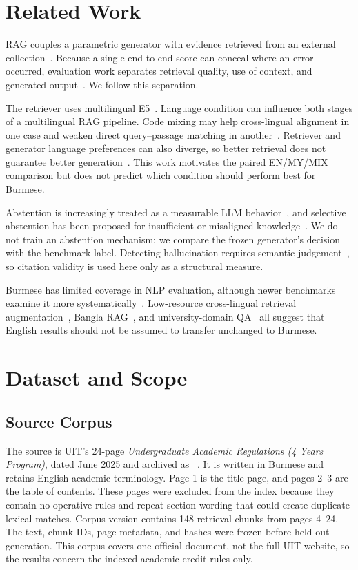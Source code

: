 \documentclass[a4paper,conference]{IEEEtran}
\newcommand{\code}[1]{\texttt{\detokenize{#1}}}
\begin{document}
\section{Related Work}
RAG couples a parametric generator with evidence retrieved from an external collection~\cite{lewis2020rag}. Because a single end-to-end score can conceal where an error occurred, evaluation work separates retrieval quality, use of context, and generated output~\cite{es2024ragas}. We follow this separation.

The retriever uses multilingual E5~\cite{wang2024e5}. Language condition can influence both stages of a multilingual RAG pipeline. Code mixing may help cross-lingual alignment in one case and weaken direct query--passage matching in another~\cite{do2024contrastivemix}. Retriever and generator language preferences can also diverge, so better retrieval does not guarantee better generation~\cite{park2025language}. This work motivates the paired EN/MY/MIX comparison but does not predict which condition should perform best for Burmese.

Abstention is increasingly treated as a measurable LLM behavior~\cite{wen2025limits}, and selective abstention has been proposed for insufficient or misaligned knowledge~\cite{huang2025abstention}. We do not train an abstention mechanism; we compare the frozen generator's decision with the benchmark label. Detecting hallucination requires semantic judgement~\cite{chang2024hallucination}, so citation validity is used here only as a structural measure.

Burmese has limited coverage in NLP evaluation, although newer benchmarks examine it more systematically~\cite{aung2026burmesesan}. Low-resource cross-lingual retrieval augmentation~\cite{nie2023parc}, Bangla RAG~\cite{ipa2025trase}, and university-domain QA~\cite{sun2024universityrag} all suggest that English results should not be assumed to transfer unchanged to Burmese.

\section{Dataset and Scope}
\subsection{Source Corpus}
The source is UIT's 24-page \emph{Undergraduate Academic Regulations (4 Years Program)}, dated June 2025 and archived as \code{UIT-SRC-025}~\cite{uit2025regulations}. It is written in Burmese and retains English academic terminology. Page 1 is the title page, and pages 2--3 are the table of contents. These pages were excluded from the index because they contain no operative rules and repeat section wording that could create duplicate lexical matches. Corpus version \code{UIT-AC-v1.1} contains 148 retrieval chunks from pages 4--24. The text, chunk IDs, page metadata, and hashes were frozen before held-out generation. This corpus covers one official document, not the full UIT website, so the results concern the indexed academic-credit rules only.
\end{document}
